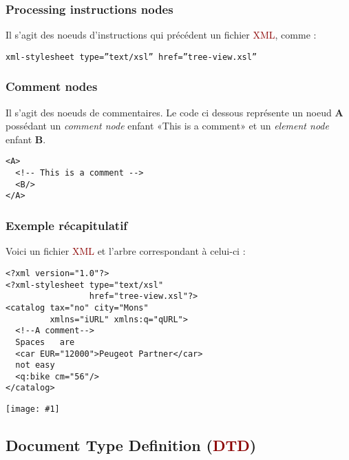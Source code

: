 \documentclass{article}
\newcommand{\red}[1]{\textcolor{darkred}{#1}}
\newcommand{\imgR}[2]{\begin{center}\texttt{[image: \#1]}\end{center}}
\begin{document}
\subsubsection{Processing instructions nodes}
Il s'agit des noeuds d'instructions qui précédent un fichier \red{XML}, comme : 
\begin{verbatim}
xml-stylesheet type=”text/xsl” href=”tree-view.xsl”
\end{verbatim}

\subsubsection{Comment nodes}
Il s'agit des noeuds de commentaires. Le code ci dessous représente un noeud \textbf{A} possédant un \textit{comment node} enfant «This is a comment» et un \textit{element 
node} enfant \textbf{B}.
\begin{verbatim}
<A>
  <!-- This is a comment -->
  <B/>
</A>
\end{verbatim}
\subsubsection{Exemple récapitulatif}
Voici un fichier \red{XML} et l'arbre correspondant à celui-ci : 

\begin{verbatim}
<?xml version="1.0"?>
<?xml-stylesheet type="text/xsl"
                 href="tree-view.xsl"?>
<catalog tax="no" city="Mons"
         xmlns="iURL" xmlns:q="qURL">
  <!--A comment-->
  Spaces   are
  <car EUR="12000">Peugeot Partner</car>
  not easy
  <q:bike cm="56"/>
</catalog>
\end{verbatim}
\imgR{CAPT_001.png}{400}

\subsection{Document Type Definition (\red{DTD})}
\end{document}

